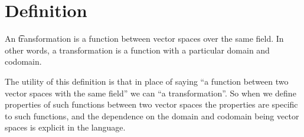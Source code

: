 
\section*{Definition}

An \t{transformation} is a function between vector spaces over the same field.
In other words, a transformation is a function with a particular domain and codomain.

The utility of this definition is that in place of saying ``a function between two vector spaces with the same field'' we can ``a transformation''.
So when we define properties of such functions between two vector spaces the properties are specific to such functions, and the dependence on the domain and codomain being vector spaces is explicit in the language.

\blankpage